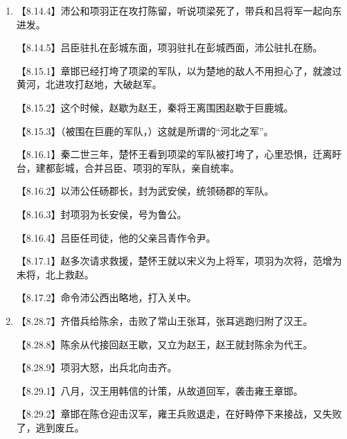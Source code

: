 \documentclass[fontset=none,11pt,a4paper]{ctexart}
\begin{document}
\begin{enumerate}[label=\Alph*.]
\noindent 【8.23.2】沛公赞成他的计策，照着做了。\par
\noindent 【8.23.3】十一月间，项羽果然率领诸侯军西进，想要入关，而关门闭着。\par
\noindent 【8.23.4】听说沛公已经平定关中，大怒，派黥布等攻破了函谷关。\par
\noindent 【8.23.5】十二月间，就到了戏水。\par
\noindent 【8.23.6】沛公左司马曹无伤听说项王发怒，\par
\noindent 【8.23.7】要攻打沛公，派人告诉项羽说：“沛公想要称王关中，令子婴为相，珍宝被他全部占有了。”\par
\noindent 【8.23.8】打算以此求得封赏。\par
  \item
\noindent 【8.14.4】沛公和项羽正在攻打陈留，听说项梁死了，带兵和吕将军一起向东进发。\par
\noindent 【8.14.5】吕臣驻扎在彭城东面，项羽驻扎在彭城西面，沛公驻扎在肠。\par
\noindent 【8.15.1】章邯已经打垮了项梁的军队，以为楚地的敌人不用担心了，就渡过黄河，北进攻打赵地，大破赵军。\par
\noindent 【8.15.2】这个时候，赵歇为赵王，秦将王离围困赵歇于巨鹿城。\par
\noindent 【8.15.3】（被围在巨鹿的军队，）这就是所谓的“河北之军”。\par
\noindent 【8.16.1】秦二世三年，楚怀王看到项梁的军队被打垮了，心里恐惧，迁离盱台，建都彭城，合并吕臣、项羽的军队，亲自统率。\par
\noindent 【8.16.2】以沛公任砀郡长，封为武安侯，统领砀郡的军队。\par
\noindent 【8.16.3】封项羽为长安侯，号为鲁公。\par
\noindent 【8.16.4】吕臣任司徒，他的父亲吕青作令尹。\par
\noindent 【8.17.1】赵多次请求救援，楚怀王就以宋义为上将军，项羽为次将，范增为未将，北上救赵。\par
\noindent 【8.17.2】命令沛公西出略地，打入关中。\par
  \item
\noindent 【8.28.7】齐借兵给陈余，击败了常山王张耳，张耳逃跑归附了汉王。\par
\noindent 【8.28.8】陈余从代接回赵王歇，又立为赵王，赵王就封陈余为代王。\par
\noindent 【8.28.9】项羽大怒，出兵北向击齐。\par
\noindent 【8.29.1】八月，汉王用韩信的计策，从故道回军，袭击雍王章邯。\par
\noindent 【8.29.2】章邯在陈仓迎击汉军，雍王兵败退走，在好畤停下来接战，又失败了，逃到废丘。\par

\end{enumerate}
\end{document}
